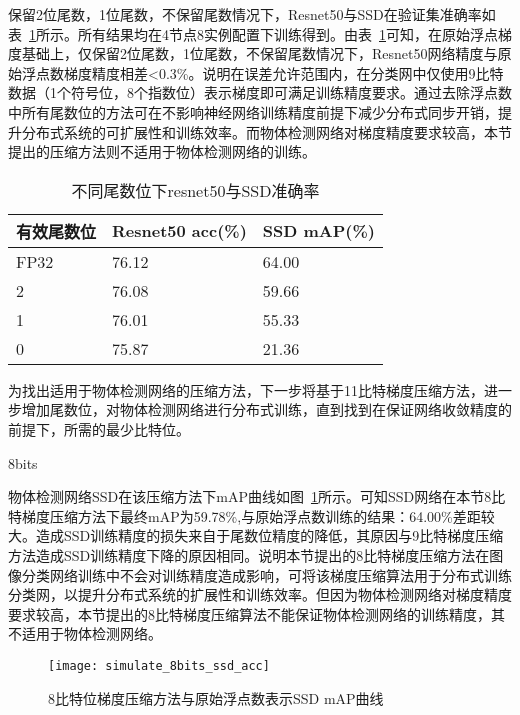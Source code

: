 保留2位尾数，1位尾数，不保留尾数情况下，Resnet50与SSD在验证集准确率如表~\ref{tab:simulate_11_10_9bits_acc}所示。所有结果均在4节点8实例配置下训练得到。由表~\ref{tab:simulate_11_10_9bits_acc}可知，在原始浮点梯度基础上，仅保留2位尾数，1位尾数，不保留尾数情况下，Resnet50网络精度与原始浮点数梯度精度相差<0.3\%。说明在误差允许范围内，在分类网中仅使用9比特数据（1个符号位，8个指数位）表示梯度即可满足训练精度要求。通过去除浮点数中所有尾数位的方法可在不影响神经网络训练精度前提下减少分布式同步开销，提升分布式系统的可扩展性和训练效率。而物体检测网络对梯度精度要求较高，本节提出的压缩方法则不适用于物体检测网络的训练。

\begin{table}[htb]
\centering
\noindent\begin{minipage}{0.6\textwidth}
\centering
\caption{不同尾数位下resnet50与SSD准确率}
\label{tab:simulate_11_10_9bits_acc}
\begin{tabular}{p{2cm}p{2.5cm}p{2.5cm}}
\toprule[1.5pt]
有效尾数位 & Resnet50 acc(\%) & SSD mAP(\%) \\\midrule[1pt]
FP32 & 76.12 & 64.00 \\
2 & 76.08 & 59.66 \\
1 & 76.01 & 55.33 \\
0 & 75.87 & 21.36 \\
\midrule[1pt]
\end{tabular}
\end{minipage}
\end{table}
为找出适用于物体检测网络的压缩方法，下一步将基于11比特梯度压缩方法，进一步增加尾数位，对物体检测网络进行分布式训练，直到找到在保证网络收敛精度的前提下，所需的最少比特位。



8bits

物体检测网络SSD在该压缩方法下mAP曲线如图~\ref{fig:simulate_8bits_ssd_acc}所示。可知SSD网络在本节8比特梯度压缩方法下最终mAP为59.78\%,与原始浮点数训练的结果：64.00\%差距较大。造成SSD训练精度的损失来自于尾数位精度的降低，其原因与9比特梯度压缩方法造成SSD训练精度下降的原因相同。说明本节提出的8比特梯度压缩方法在图像分类网络训练中不会对训练精度造成影响，可将该梯度压缩算法用于分布式训练分类网，以提升分布式系统的扩展性和训练效率。但因为物体检测网络对梯度精度要求较高，本节提出的8比特梯度压缩算法不能保证物体检测网络的训练精度，其不适用于物体检测网络。
\begin{figure}[htp]
\centering
\texttt{[image: simulate\_8bits\_ssd\_acc]}
\caption{8比特位梯度压缩方法与原始浮点数表示SSD mAP曲线}
\label{fig:simulate_8bits_ssd_acc}
\end{figure}

